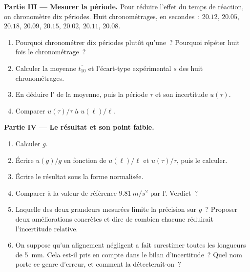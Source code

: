 \begin{problem}
\medskip
\noindent\textbf{Partie III --- Mesurer la période.}
Pour réduire l'effet du temps de réaction, on chronomètre dix périodes.
Huit chronométrages, en secondes~: $20.12$, $20.05$, $20.18$, $20.09$,
$20.15$, $20.02$, $20.11$, $20.08$.
\begin{enumerate}[resume]
  \item Pourquoi chronométrer dix périodes plutôt qu'une~? Pourquoi
        répéter huit fois le chronométrage~?
  \item Calculer la moyenne $\overline{t_{10}}$ et l'écart-type
        expérimental $s$ des huit chronométrages.
  \item En déduire l' de la moyenne, puis la période
        $\tau$ et son incertitude $u(\tau)$.
  \item Comparer $u(\tau)/\tau$ à $u(\ell)/\ell$.
\end{enumerate}

\medskip
\noindent\textbf{Partie IV --- Le résultat et son point faible.}
\begin{enumerate}[resume]
  \item Calculer $g$.
  \item Écrire $u(g)/g$ en fonction de $u(\ell)/\ell$ et $u(\tau)/\tau$,
        puis le calculer.
  \item Écrire le résultat sous la forme normalisée.
  \item Comparer à la valeur de référence $\qty{9.81}{m/s^2}$ par
        l'. Verdict~?
  \item Laquelle des deux grandeurs mesurées limite la précision sur
        $g$~? Proposer deux améliorations concrètes et dire de combien
        chacune réduirait l'incertitude relative.
  \item On suppose qu'un alignement négligent a fait surestimer toutes
        les longueurs de \qty{5}{mm}. Cela est-il pris en compte dans le
        bilan d'incertitude~? Quel nom porte ce genre d'erreur, et
        comment la détecterait-on~?
\end{enumerate}


\end{problem}
